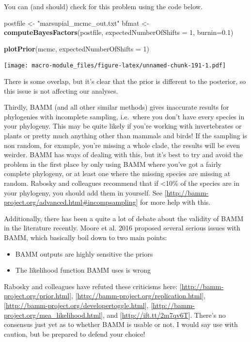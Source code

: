 \documentclass[]{book}
\newenvironment{Shaded}{\begin{snugshade}}{\end{snugshade}}
\newcommand{\KeywordTok}[1]{\textcolor[rgb]{0.13,0.29,0.53}{\textbf{{#1}}}}
\newcommand{\DataTypeTok}[1]{\textcolor[rgb]{0.13,0.29,0.53}{{#1}}}
\newcommand{\DecValTok}[1]{\textcolor[rgb]{0.00,0.00,0.81}{{#1}}}
\newcommand{\FloatTok}[1]{\textcolor[rgb]{0.00,0.00,0.81}{{#1}}}
\newcommand{\StringTok}[1]{\textcolor[rgb]{0.31,0.60,0.02}{{#1}}}
\newcommand{\NormalTok}[1]{{#1}}
\providecommand{\tightlist}{%
  \setlength{\itemsep}{0pt}\setlength{\parskip}{0pt}}
\begin{document}
You can (and should) check for this problem using the code below.

\begin{Shaded}
\begin{Highlighting}[]
\NormalTok{postfile <-}\StringTok{ "marsupial_mcmc_out.txt"}
\NormalTok{bfmat <-}\StringTok{ }\KeywordTok{computeBayesFactors}\NormalTok{(postfile, }\DataTypeTok{expectedNumberOfShifts =} \DecValTok{1}\NormalTok{, }\DataTypeTok{burnin=}\FloatTok{0.1}\NormalTok{)}

\KeywordTok{plotPrior}\NormalTok{(mcmc, }\DataTypeTok{expectedNumberOfShifts =} \DecValTok{1}\NormalTok{)}
\end{Highlighting}
\end{Shaded}

\texttt{[image: macro-module\_files/figure-latex/unnamed-chunk-191-1.pdf]}

There is some overlap, but it's clear that the prior is different to the
posterior, so this issue is not affecting our analyses.

Thirdly, BAMM (and all other similar methods) gives inaccurate results
for phylogenies with incomplete sampling, i.e.~where you don't have
every species in your phylogeny. This may be quite likely if you're
working with invertebrates or plants or pretty much anything other than
mammals and birds! If the sampling is non random, for example, you're
missing a whole clade, the results will be even weirder. BAMM has ways
of dealing with this, but it's best to try and avoid the problem in the
first place by only using BAMM where you've got a fairly complete
phylogeny, or at least one where the missing species are missing at
random. Rabosky and colleagues recommend that if \textless{}10\% of the
species are in your phylogeny, you should add them in yourself. See
{[}\url{http://bamm-project.org/advanced.html\#incompsampling}{]} for
more help with this.

Additionally, there has been a quite a lot of debate about the validity
of BAMM in the literature recently. Moore et al. 2016 proposed several
serious issues with BAMM, which basically boil down to two main points:

\begin{itemize}
\tightlist
\item
  BAMM outputs are highly sensitive the priors
\item
  The likelihood function BAMM uses is wrong
\end{itemize}

Rabosky and colleagues have refuted these criticisms here:
{[}\url{http://bamm-project.org/prior.html}{]},
{[}\url{http://bamm-project.org/replication.html}{]},
{[}\url{http://bamm-project.org/developertoggle.html}{]},
{[}\url{http://bamm-project.org/mea_likelihood.html}{]}, and
{[}\url{http://ift.tt/2m7qv6T}{]}. There's no consensus just yet as to
whether BAMM is usable or not. I would say use with caution, but be
prepared to defend your choice!
\end{document}

